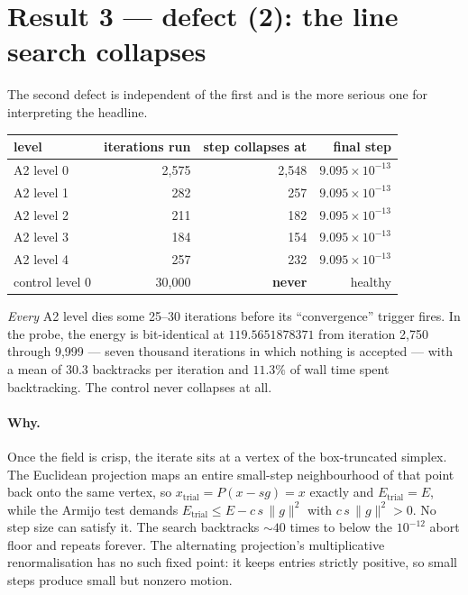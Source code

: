 \documentclass[11pt,a4paper]{article}
\begin{document}
\section{Result 3 --- defect (2): the line search collapses}
\label{sec:defect2}

The second defect is independent of the first and is the more serious one for
interpreting the headline.

\begin{center}
\begin{tabular}{@{}lrrr@{}}
\toprule
level & iterations run & step collapses at & final step \\
\midrule
A2 level 0 & 2{,}575 & 2{,}548 & \(9.095\times10^{-13}\) \\
A2 level 1 & 282 & 257 & \(9.095\times10^{-13}\) \\
A2 level 2 & 211 & 182 & \(9.095\times10^{-13}\) \\
A2 level 3 & 184 & 154 & \(9.095\times10^{-13}\) \\
A2 level 4 & 257 & 232 & \(9.095\times10^{-13}\) \\
\midrule
control level 0 & 30{,}000 & \textbf{never} & healthy \\
\bottomrule
\end{tabular}
\end{center}

\emph{Every} A2 level dies some 25--30 iterations before its ``convergence''
trigger fires. In the probe, the energy is bit-identical at
\(119.5651878371\) from iteration 2{,}750 through 9{,}999 --- seven thousand
iterations in which nothing is accepted --- with a mean of \(30.3\) backtracks
per iteration and \(11.3\%\) of wall time spent backtracking. The control never
collapses at all.

\paragraph{Why.} Once the field is crisp, the iterate sits at a vertex of the
box-truncated simplex. The Euclidean projection maps an entire small-step
neighbourhood of that point back onto the same vertex, so
\(x_{\text{trial}} = P(x - s g) = x\) exactly and \(E_{\text{trial}} = E\), while
the Armijo test demands \(E_{\text{trial}} \le E - c\,s\,\|g\|^2\) with
\(c\,s\,\|g\|^2 > 0\). No step size can satisfy it. The search backtracks
\(\sim\!40\) times to below the \(10^{-12}\) abort floor and repeats forever. The
alternating projection's multiplicative renormalisation has no such fixed point:
it keeps entries strictly positive, so small steps produce small but nonzero
motion.
\end{document}
